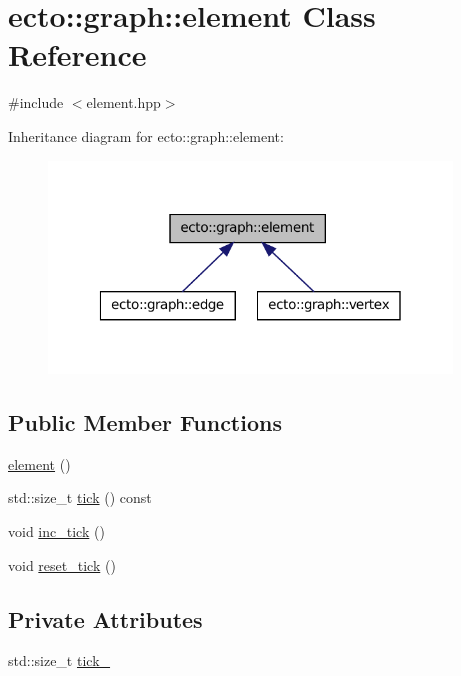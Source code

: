 \hypertarget{classecto_1_1graph_1_1element}{\section{ecto\-:\-:graph\-:\-:element \-Class \-Reference}
\label{classecto_1_1graph_1_1element}
}


{\ttfamily \#include $<$element.\-hpp$>$}



\-Inheritance diagram for ecto\-:\-:graph\-:\-:element\-:\nopagebreak
\begin{figure}[H]
\begin{center}
\leavevmode
\includegraphics[width=304pt]{classecto_1_1graph_1_1element__inherit__graph}
\end{center}
\end{figure}
\subsection*{\-Public \-Member \-Functions}
\begin{DoxyCompactItemize}
\item 
\hyperlink{classecto_1_1graph_1_1element_abf5d2137a1fd29f25af2b8f6bd0397df}{element} ()
\item 
std\-::size\-\_\-t \hyperlink{classecto_1_1graph_1_1element_a966b0c7cd87bdc5c5787d9b110966d8f}{tick} () const 
\item 
void \hyperlink{classecto_1_1graph_1_1element_a5d5b283bacb5371285e27c0f42e54985}{inc\-\_\-tick} ()
\item 
void \hyperlink{classecto_1_1graph_1_1element_a6417601ffd8159b6e00f2ff57eda1b99}{reset\-\_\-tick} ()
\end{DoxyCompactItemize}
\subsection*{\-Private \-Attributes}
\begin{DoxyCompactItemize}
\item 
std\-::size\-\_\-t \hyperlink{classecto_1_1graph_1_1element_a6f850cead9edb37941344fdbd40ae112}{tick\-\_\-}
\end{DoxyCompactItemize}


